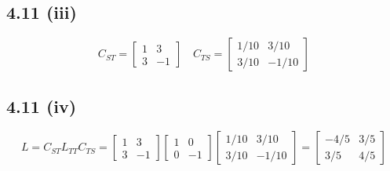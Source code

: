 \documentclass[letterpaper,12pt]{article}
\theoremstyle{definition}
\begin{document}
\subsection*{4.11 (iii)}
\[
C_{ST} = \begin{bmatrix} 1 & 3 \\ 3 & -1 \end{bmatrix}
\quad
C_{TS} = \begin{bmatrix} 1/10 & 3/10 \\ 3/10 & -1/10 \end{bmatrix}
\]
\subsection*{4.11 (iv)}
\[   
L = C_{ST}L_{TT}C_{TS} = 
\begin{bmatrix} 1 & 3 \\ 3 & -1 \end{bmatrix}
\begin{bmatrix} 1 & 0 \\ 0 & -1 \end{bmatrix}
\begin{bmatrix} 1/10 & 3/10 \\ 3/10 & -1/10 \end{bmatrix}
=
\begin{bmatrix} -4/5 & 3/5 \\ 3/5 & 4/5 \end{bmatrix}
\]
\end{document}
